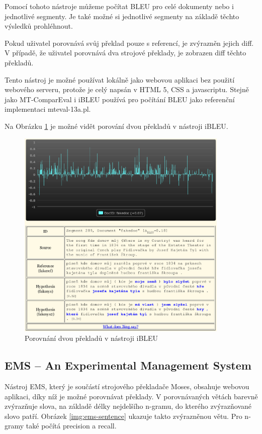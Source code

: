 Pomocí tohoto nástroje můžeme počítat BLEU pro celé dokumenty nebo i jednotlivé segmenty.
Je také možné si jednotlivé segmenty na základě těchto výsledků prohléhnout.

Pokud uživatel porovnává svůj překlad pouze s referencí,
  je zvýrazněn jejich diff.
V případě, že uživatel porovnává dva strojové překlady,
  je zobrazen diff těchto překladů.

Tento nástroj je možné používat lokálně jako webovou aplikaci bez použití webového serveru,
  protože je celý napsán v HTML 5, CSS a javascriptu.
Stejně jako MT-ComparEval i iBLEU používá pro počítání BLEU jako referenční implementaci mteval-13a.pl.

Na Obrázku \ref{img:ibleu} je možné vidět porování dvou překladů v nástroji iBLEU.
\begin{figure}
  \center
  \includegraphics[width=0.9\textwidth]{img/ibleu.eps}
  \caption{Porovnání dvou překladů v nástroji iBLEU}
  \label{img:ibleu}
\end{figure}


\subsection{EMS -- An Experimental Management System}
Nástroj EMS,
  který je součástí strojového překladače Moses,
  obsahuje webovou aplikaci,
  díky níž je možné porovnávat překlady.
V porovnávaných větách barevně zvýrazňuje slova,
  na základě délky nejdelšího \mbox{n-gramu},
  do kterého zvýrazňované slovo patří.
Obrázek \ref{img:ems-sentence} ukazuje takto zvýrazněnou větu.
Pro \mbox{n-gramy} také počítá precision a recall.

